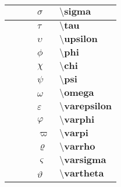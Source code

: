 \documentclass[10pt]{article}
\begin{document}
\begin{table}[h]
\begin{tabular}{|l|l|l|l|l|}
$\textbf{}$   & $\textbf{}$   &    & $\sigma$   & $\textbf{\textbackslash sigma}$   \\ \hline
$\textbf{}$   & $\textbf{}$   &    & $\tau$   & $\textbf{\textbackslash tau}$   \\ \hline
$\textbf{}$   & $\textbf{}$   &    & $\upsilon$   & $\textbf{\textbackslash upsilon}$   \\ \hline
$\textbf{}$   & $\textbf{}$   &    & $\phi$   & $\textbf{\textbackslash phi}$   \\ \hline
$\textbf{}$   & $\textbf{}$   &    & $\chi$   & $\textbf{\textbackslash chi}$   \\ \hline
$\textbf{}$   & $\textbf{}$   &    & $\psi$   & $\textbf{\textbackslash psi}$   \\ \hline
$\textbf{}$   & $\textbf{}$   &    & $\omega$   & $\textbf{\textbackslash omega}$   \\ \hline


$\textbf{}$   & $\textbf{}$   &    & $\varepsilon$   & $\textbf{\textbackslash varepsilon}$   \\ \hline
$\textbf{}$   & $\textbf{}$   &    & $\varphi$   & $\textbf{\textbackslash varphi}$   \\ \hline
$\textbf{}$   & $\textbf{}$   &    & $\varpi$   & $\textbf{\textbackslash varpi}$   \\ \hline
$\textbf{}$   & $\textbf{}$   &    & $\varrho$   & $\textbf{\textbackslash varrho}$   \\ \hline
$\textbf{}$   & $\textbf{}$   &    & $\varsigma$   & $\textbf{\textbackslash varsigma}$   \\ \hline
$\textbf{}$   & $\textbf{}$   &    & $\vartheta$   & $\textbf{\textbackslash vartheta}$   \\ \hline
\end{tabular}
\end{table}
\end{document}
